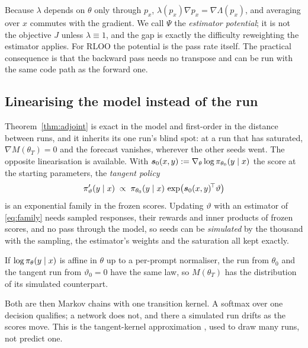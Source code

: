 Because $\lambda$ depends on $\theta$ only through $p_x$, $\lambda(p_x)\nabla p_x = \nabla
\Lambda(p_x)$, and averaging over $x$ commutes with the gradient. We call $\Psi$ the
\emph{estimator potential}; it is not the objective $J$ unless $\lambda \equiv 1$, and the gap is
exactly the difficulty reweighting the estimator applies. For RLOO the potential is the pass rate
itself. The practical consequence is that the backward pass needs no transpose and can be run with
the same code path as the forward one.

\subsection{Linearising the model instead of the run}
\label{sec:tangent}

Theorem~\ref{thm:adjoint} is exact in the model and first-order in the distance between runs, and
it inherits its one run's blind spot: at a run that has saturated, $\nabla M(\theta_T) = 0$ and the
forecast vanishes, wherever the other seeds went. The opposite linearisation is available. With
$\bm{s}_0(x,y) := \nabla_\theta\log\pi_{\theta_0}(y \mid x)$ the score at the starting parameters,
the \emph{tangent policy}
\begin{equation}
  \label{eq:tangent}
  \pi'_{\vartheta}(y \mid x) \;\propto\;
  \pi_{\theta_0}(y \mid x)\,\exp\!\big(\bm{s}_0(x,y)^{\!\top}\vartheta\big)
\end{equation}
is an exponential family in the frozen scores. Updating $\vartheta$ with an estimator of
\eqref{eq:family} needs sampled responses, their rewards and inner products of frozen scores, and
no pass through the model, so seeds can be \emph{simulated} by the thousand with the sampling, the
estimator's weights and the saturation all kept exactly.

\begin{proposition}
  \label{prop:tangent}
  If $\log\pi_{\theta}(y \mid x)$ is affine in $\theta$ up to a per-prompt normaliser, the run from
  $\theta_0$ and the tangent run from $\vartheta_0 = 0$ have the same law, so $M(\theta_T)$ has the
  distribution of its simulated counterpart.
\end{proposition}

Both are then Markov chains with one transition kernel. A softmax over one decision qualifies; a
network does not, and there a simulated run drifts as the scores move. This is the tangent-kernel
approximation \citep{jacot2018ntk, malladi2023kernel}, used to draw many runs, not predict one.
